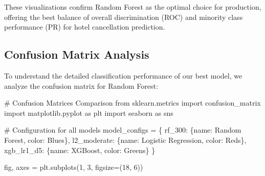 \documentclass[
  letterpaper,
  DIV=11,
  numbers=noendperiod]{scrartcl}
\newenvironment{Shaded}{\begin{snugshade}}{\end{snugshade}}
\newcommand{\CommentTok}[1]{\textcolor[rgb]{0.37,0.37,0.37}{#1}}
\newcommand{\DecValTok}[1]{\textcolor[rgb]{0.68,0.00,0.00}{#1}}
\newcommand{\ImportTok}[1]{\textcolor[rgb]{0.00,0.46,0.62}{#1}}
\newcommand{\NormalTok}[1]{\textcolor[rgb]{0.00,0.23,0.31}{#1}}
\newcommand{\OperatorTok}[1]{\textcolor[rgb]{0.37,0.37,0.37}{#1}}
\newcommand{\StringTok}[1]{\textcolor[rgb]{0.13,0.47,0.30}{#1}}
\renewenvironment{Shaded}{%
  \begin{tcolorbox}[%
    enhanced,%
    colback=codebg,%
    colframe=codebg,%
    borderline west={3pt}{0pt}{sectionblue},%
    fontupper=\small\ttfamily,%
    boxrule=0pt,%
    arc=0pt,%
    boxsep=5pt,%
    left=2mm,%
    right=2mm,%
    top=2mm,%
    bottom=2mm%
  ]%
}{%
  \end{tcolorbox}%
}
\begin{document}
These visualizations confirm Random Forest as the optimal choice for
production, offering the best balance of overall discrimination (ROC)
and minority class performance (PR) for hotel cancellation prediction.

\subsection{Confusion Matrix Analysis}\label{confusion-matrix-analysis}

To understand the detailed classification performance of our best model,
we analyze the confusion matrix for Random Forest:

\begin{Shaded}
\begin{Highlighting}[]
\CommentTok{\# Confusion Matrices Comparison}
\ImportTok{from}\NormalTok{ sklearn.metrics }\ImportTok{import}\NormalTok{ confusion\_matrix}
\ImportTok{import}\NormalTok{ matplotlib.pyplot }\ImportTok{as}\NormalTok{ plt}
\ImportTok{import}\NormalTok{ seaborn }\ImportTok{as}\NormalTok{ sns}

\CommentTok{\# Configuration for all models}
\NormalTok{model\_configs }\OperatorTok{=}\NormalTok{ \{}
    \StringTok{\textquotesingle{}rf\_300\textquotesingle{}}\NormalTok{: \{}\StringTok{\textquotesingle{}name\textquotesingle{}}\NormalTok{: }\StringTok{\textquotesingle{}Random Forest\textquotesingle{}}\NormalTok{, }\StringTok{\textquotesingle{}color\textquotesingle{}}\NormalTok{: }\StringTok{\textquotesingle{}Blues\textquotesingle{}}\NormalTok{\},}
    \StringTok{\textquotesingle{}l2\_moderate\textquotesingle{}}\NormalTok{: \{}\StringTok{\textquotesingle{}name\textquotesingle{}}\NormalTok{: }\StringTok{\textquotesingle{}Logistic Regression\textquotesingle{}}\NormalTok{, }\StringTok{\textquotesingle{}color\textquotesingle{}}\NormalTok{: }\StringTok{\textquotesingle{}Reds\textquotesingle{}}\NormalTok{\}, }
    \StringTok{\textquotesingle{}xgb\_lr1\_d5\textquotesingle{}}\NormalTok{: \{}\StringTok{\textquotesingle{}name\textquotesingle{}}\NormalTok{: }\StringTok{\textquotesingle{}XGBoost\textquotesingle{}}\NormalTok{, }\StringTok{\textquotesingle{}color\textquotesingle{}}\NormalTok{: }\StringTok{\textquotesingle{}Greens\textquotesingle{}}\NormalTok{\}}
\NormalTok{\}}

\NormalTok{fig, axes }\OperatorTok{=}\NormalTok{ plt.subplots(}\DecValTok{1}\NormalTok{, }\DecValTok{3}\NormalTok{, figsize}\OperatorTok{=}\NormalTok{(}\DecValTok{18}\NormalTok{, }\DecValTok{6}\NormalTok{))}


\end{Highlighting}
\end{Shaded}
\end{document}
